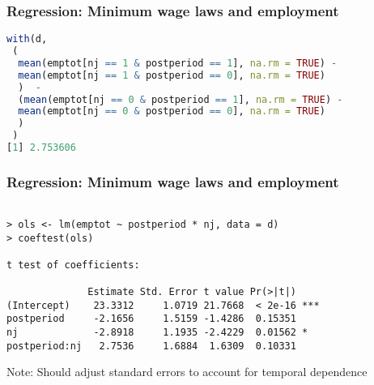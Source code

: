 \documentclass{beamer}
\numberwithin{equation}{section}
\begin{document}
\begin{frame}[fragile]
  \frametitle{Regression: Minimum wage laws and employment}

\footnotesize
\begin{lstlisting}[language=R, basicstyle=\ttfamily]
with(d, 
 (
  mean(emptot[nj == 1 & postperiod == 1], na.rm = TRUE) - 
  mean(emptot[nj == 1 & postperiod == 0], na.rm = TRUE)
  )  - 
  (mean(emptot[nj == 0 & postperiod == 1], na.rm = TRUE) - 
  mean(emptot[nj == 0 & postperiod == 0], na.rm = TRUE)
  )
 )
[1] 2.753606
\end{lstlisting}

\end{frame}


\begin{frame}[fragile]
  \frametitle{Regression: Minimum wage laws and employment}

\footnotesize
\begin{verbatim}

> ols <- lm(emptot ~ postperiod * nj, data = d)
> coeftest(ols)

t test of coefficients:

              Estimate Std. Error t value Pr(>|t|)    
(Intercept)    23.3312     1.0719 21.7668  < 2e-16 ***
postperiod     -2.1656     1.5159 -1.4286  0.15351    
nj             -2.8918     1.1935 -2.4229  0.01562 *  
postperiod:nj   2.7536     1.6884  1.6309  0.10331    
\end{verbatim}
Note: Should adjust standard errors to account for temporal dependence


\end{frame}

%
%
%
%
%
%
%
\end{document}
